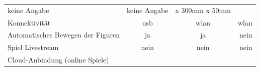 \begin{longtable}[]{@{}lccr@{}}
\begin{minipage}[t]{0.25\columnwidth}
keine Angabe\strut
\end{minipage} & \begin{minipage}[t]{0.26\columnwidth}\centering
keine Angabe\strut
\end{minipage} & \begin{minipage}[t]{0.19\columnwidth}\raggedleft
450mm x 300mm x 50mm\strut
\end{minipage}\tabularnewline
\begin{minipage}[t]{0.19\columnwidth}\raggedright
Konnektivität\strut
\end{minipage} & \begin{minipage}[t]{0.25\columnwidth}\centering
\gls{usb}\strut
\end{minipage} & \begin{minipage}[t]{0.26\columnwidth}\centering
\gls{wlan}\strut
\end{minipage} & \begin{minipage}[t]{0.19\columnwidth}\raggedleft
\gls{wlan}\strut
\end{minipage}\tabularnewline
\begin{minipage}[t]{0.19\columnwidth}\raggedright
Automatisches Bewegen der Figuren\strut
\end{minipage} & \begin{minipage}[t]{0.25\columnwidth}\centering
ja\strut
\end{minipage} & \begin{minipage}[t]{0.26\columnwidth}\centering
ja\strut
\end{minipage} & \begin{minipage}[t]{0.19\columnwidth}\raggedleft
nein\strut
\end{minipage}\tabularnewline
\begin{minipage}[t]{0.19\columnwidth}\raggedright
Spiel Livestream\strut
\end{minipage} & \begin{minipage}[t]{0.25\columnwidth}\centering
nein\strut
\end{minipage} & \begin{minipage}[t]{0.26\columnwidth}\centering
nein\strut
\end{minipage} & \begin{minipage}[t]{0.19\columnwidth}\raggedleft
nein\strut
\end{minipage}\tabularnewline
\begin{minipage}[t]{0.19\columnwidth}\raggedright
Cloud-Anbindung (online Spiele)\strut
\end{minipage} & \begin{minipage}[t]{0.25\columnwidth}\centering

\end{minipage}
\end{longtable}
